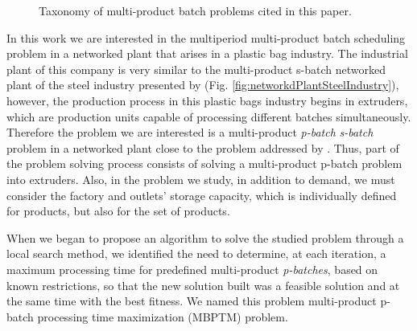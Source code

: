 \documentclass[authoryear,manuscript,12pt]{elsarticle}
\begin{document}
\begin{figure}[h]
\begin{center}
\end{center}
\caption{Taxonomy of multi-product batch problems cited in this paper.}
\end{figure}

In this work we are interested in the multiperiod multi-product batch scheduling problem in a networked plant that arises in a plastic bag industry. The industrial plant of this company is very similar to the multi-product s-batch networked plant of the steel industry presented by \cite{LiuEtAl2020} (Fig. \ref{fig:networkdPlantSteelIndustry}), however, the production process in this plastic bags industry begins in extruders, which are production units capable of processing different batches simultaneously. Therefore the problem we are interested is a multi-product \emph{p-batch} \emph{s-batch} problem in a networked plant close to the problem addressed by \cite{LiEtAl2022}. Thus, part of the problem solving process consists of solving a multi-product p-batch problem into extruders. Also, in the problem we study, in addition to demand, we must consider the factory and outlets' storage capacity, which is individually defined for products, but also for the set of products. 

When we began to propose an algorithm to solve the studied problem through a local search method, we identified the need to determine, at each iteration, a maximum processing time for predefined multi-product \emph{p-batches}, based on known restrictions, so that the new solution built was a feasible solution and at the same time with the best fitness. We named this problem multi-product p-batch processing time maximization (MBPTM) problem. 
\end{document}
